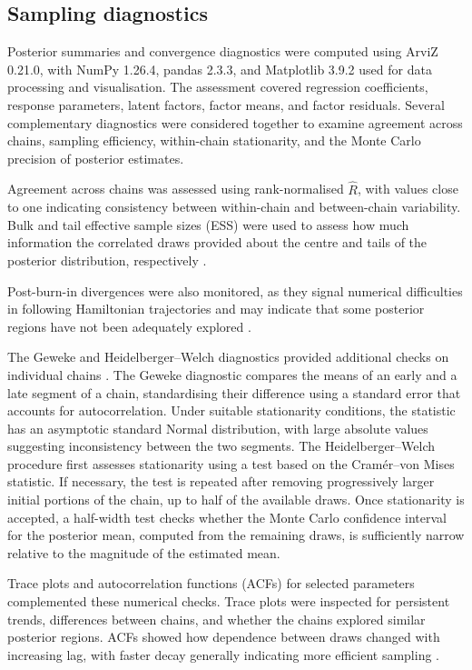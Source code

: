 \documentclass[pdftex,12pt,openright,a4paper,oneside]{book}
\begin{document}
\subsection{Sampling diagnostics}
\label{subsec:sampling_diagnostics}

Posterior summaries and convergence diagnostics were
computed using ArviZ 0.21.0, with NumPy 1.26.4,
pandas 2.3.3, and Matplotlib 3.9.2 used for data
processing and visualisation.
The assessment covered regression coefficients,
response parameters, latent factors, factor means,
and factor residuals. Several complementary diagnostics
were considered together to examine agreement across
chains, sampling efficiency, within-chain stationarity,
and the Monte Carlo precision of posterior estimates.

Agreement across chains was assessed using
rank-normalised $\widehat{R}$, with values close to
one indicating consistency between within-chain
and between-chain variability. Bulk and tail effective
sample sizes (ESS) were used to assess how much
information the correlated draws provided about
the centre and tails of the posterior distribution,
respectively \citep{vehtari2021rank}.

Post-burn-in divergences were also monitored, as they
signal numerical difficulties in following Hamiltonian
trajectories and may indicate that some posterior
regions have not been adequately explored
\citep{betancourt2017conceptual}.

The Geweke and Heidelberger--Welch diagnostics provided
additional checks on individual chains
\citep{geweke1992evaluating,heidelberger1983simulation}.
The Geweke diagnostic compares the means of an early
and a late segment of a chain, standardising their
difference using a standard error that accounts for
autocorrelation. Under suitable stationarity conditions,
the statistic has an asymptotic standard Normal
distribution, with large absolute values suggesting
inconsistency between the two segments.
The Heidelberger--Welch procedure first assesses
stationarity using a test based on the
Cramér--von Mises statistic. If necessary, the test
is repeated after removing progressively larger
initial portions of the chain, up to half of the
available draws. Once stationarity is accepted,
a half-width test checks whether the Monte Carlo
confidence interval for the posterior mean, computed
from the remaining draws, is sufficiently narrow
relative to the magnitude of the estimated mean.

Trace plots and autocorrelation functions (ACFs)
for selected parameters complemented these numerical
checks. Trace plots were inspected for persistent
trends, differences between chains, and whether the
chains explored similar posterior regions.
ACFs showed how dependence between draws changed
with increasing lag, with faster decay generally
indicating more efficient sampling
\citep{vehtari2021rank}.
\end{document}
